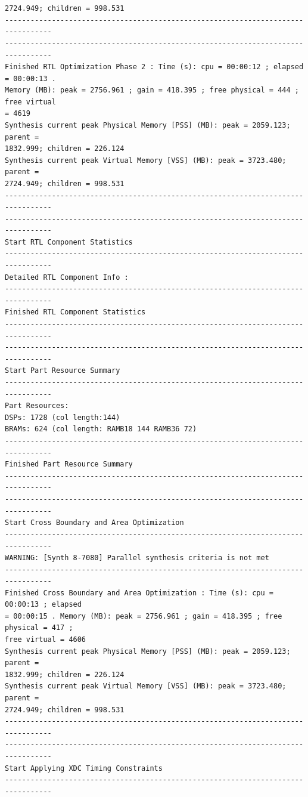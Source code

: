 \documentclass{article}
\begin{document}
\begin{lstlisting}
2724.949; children = 998.531
---------------------------------------------------------------------------------
---------------------------------------------------------------------------------
Finished RTL Optimization Phase 2 : Time (s): cpu = 00:00:12 ; elapsed = 00:00:13 . 
Memory (MB): peak = 2756.961 ; gain = 418.395 ; free physical = 444 ; free virtual 
= 4619
Synthesis current peak Physical Memory [PSS] (MB): peak = 2059.123; parent = 
1832.999; children = 226.124
Synthesis current peak Virtual Memory [VSS] (MB): peak = 3723.480; parent = 
2724.949; children = 998.531
---------------------------------------------------------------------------------
---------------------------------------------------------------------------------
Start RTL Component Statistics 
---------------------------------------------------------------------------------
Detailed RTL Component Info : 
---------------------------------------------------------------------------------
Finished RTL Component Statistics 
---------------------------------------------------------------------------------
---------------------------------------------------------------------------------
Start Part Resource Summary
---------------------------------------------------------------------------------
Part Resources:
DSPs: 1728 (col length:144)
BRAMs: 624 (col length: RAMB18 144 RAMB36 72)
---------------------------------------------------------------------------------
Finished Part Resource Summary
---------------------------------------------------------------------------------
---------------------------------------------------------------------------------
Start Cross Boundary and Area Optimization
---------------------------------------------------------------------------------
WARNING: [Synth 8-7080] Parallel synthesis criteria is not met
---------------------------------------------------------------------------------
Finished Cross Boundary and Area Optimization : Time (s): cpu = 00:00:13 ; elapsed 
= 00:00:15 . Memory (MB): peak = 2756.961 ; gain = 418.395 ; free physical = 417 ; 
free virtual = 4606
Synthesis current peak Physical Memory [PSS] (MB): peak = 2059.123; parent = 
1832.999; children = 226.124
Synthesis current peak Virtual Memory [VSS] (MB): peak = 3723.480; parent = 
2724.949; children = 998.531
---------------------------------------------------------------------------------
---------------------------------------------------------------------------------
Start Applying XDC Timing Constraints
---------------------------------------------------------------------------------

\end{lstlisting}
\end{document}
